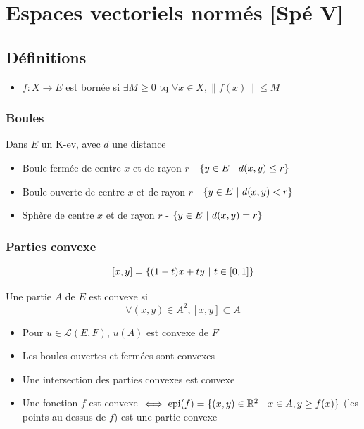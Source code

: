 \documentclass[openany]{book}
\begin{document}
\clearpage
\section{Espaces vectoriels normés [Spé V]}

\subsection{Définitions}

\begin{itemize}
    \item $f : X \rightarrow E$ est bornée si $\exists M \geq 0$ tq $\forall x \in X, \|f(x)\| \leq M$
\end{itemize}

\subsubsection{Boules}
Dans $E$ un K-ev, avec $d$ une distance
\begin{itemize}
    \item Boule fermée de centre $x$ et de rayon $r$ - $\{ y \in E \text{ } | \text{ } d(x, y) \leq r \}$
    \item Boule ouverte de centre $x$ et de rayon $r$ - $\{ y \in E \text{ } | \text{ } d(x, y) < r \}$
    \item Sphère de centre $x$ et de rayon $r$ - $\{ y \in E \text{ } | \text{ } d(x, y) = r \}$
\end{itemize}

\subsubsection{Parties convexe}
\[ [x, y] = \{ (1-t)x + ty \text{ } | \text{ } t \in [0, 1] \} \]

Une partie $A$ de $E$ est convexe si
\[ \forall (x, y) \in A^2, [x, y] \subset A \]

\begin{itemize}
    \item Pour $u \in \mathcal{L}(E, F)$, $u(A)$ est convexe de $F$
    \item Les boules ouvertes et fermées sont convexes
    \item Une intersection des parties convexes est convexe
    \item Une fonction $f$ est convexe $ \iff \text{epi}(f) = \{ (x, y) \in \mathbb{R}^2 \text{ } | \text{ } x \in A, y \geq f(x) \}$ (les points au dessus de $f$) est une partie convexe
\end{itemize}
\end{document}
